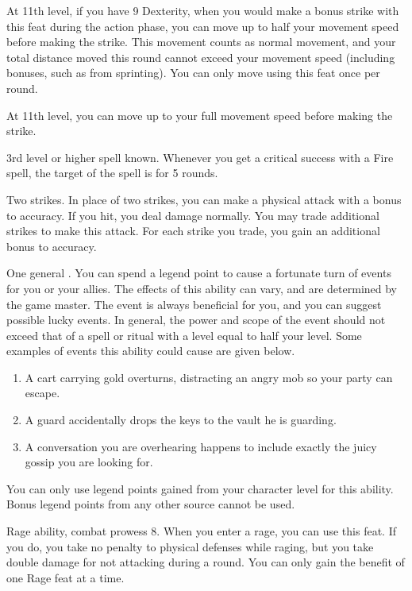 At 11th level, if you have 9 Dexterity, when you would make a bonus strike with this feat during the action phase, you can move up to half your movement speed before making the strike.
This movement counts as normal movement, and your total distance moved this round cannot exceed your movement speed (including bonuses, such as from sprinting).
You can only move using this feat once per round.

At 11th level, you can move up to your full movement speed before making the strike.

\featpre 3rd level or higher  spell known.
\featben Whenever you get a critical success with a Fire spell, the target of the spell is \ignited for 5 rounds.

\featpre Two strikes.
\featben In place of two strikes, you can make a physical attack with a  bonus to accuracy.
If you hit, you deal damage normally.
You may trade additional strikes to make this attack.
For each strike you trade, you gain an additional  bonus to accuracy.

\featpre One general .
\featben You can spend a legend point to cause a fortunate turn of events for you or your allies.
The effects of this ability can vary, and are determined by the game master.
The event is always beneficial for you, and you can suggest possible lucky events.
In general, the power and scope of the event should not exceed that of a spell or ritual with a level equal to half your level.
Some examples of events this ability could cause are given below.
\begin{enumerate}
    \item A cart carrying gold overturns, distracting an angry mob so your party can escape.
    \item A guard accidentally drops the keys to the vault he is guarding.
    \item A conversation you are overhearing happens to include exactly the juicy gossip you are looking for.
\end{enumerate}

You can only use legend points gained from your character level for this ability.
Bonus legend points from any other source cannot be used.

\featpres Rage ability, combat prowess 8.
\featben When you enter a rage, you can use this feat. If you do, you take no penalty to physical defenses while raging, but you take double damage for not attacking during a round.
 You can only gain the benefit of one Rage feat at a time.

